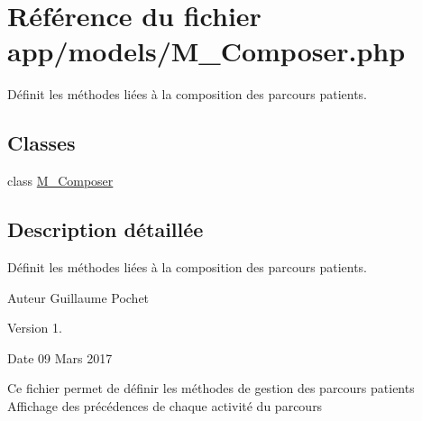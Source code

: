 \hypertarget{_m___composer_8php}{}\section{Référence du fichier app/models/\+M\+\_\+\+Composer.php}
\label{_m___composer_8php}


Définit les méthodes liées à la composition des parcours patients.  


\subsection*{Classes}
\begin{DoxyCompactItemize}
\item 
class \hyperlink{class_m___composer}{M\+\_\+\+Composer}
\end{DoxyCompactItemize}


\subsection{Description détaillée}
Définit les méthodes liées à la composition des parcours patients. 

\begin{DoxyAuthor}{Auteur}
Guillaume Pochet 
\end{DoxyAuthor}
\begin{DoxyVersion}{Version}
1. 
\end{DoxyVersion}
\begin{DoxyDate}{Date}
09 Mars 2017
\end{DoxyDate}
Ce fichier permet de définir les méthodes de gestion des parcours patients Affichage des précédences de chaque activité du parcours 